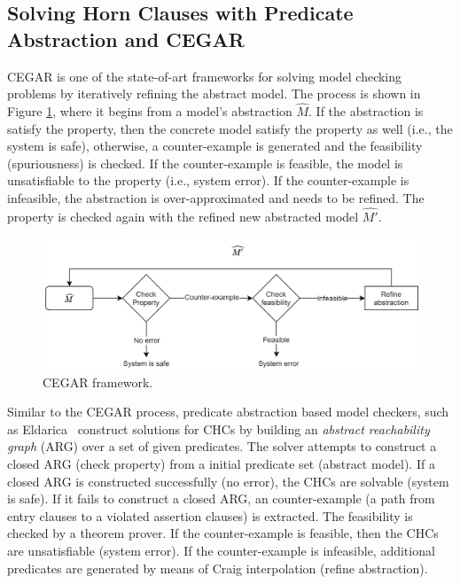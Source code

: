 \subsection{Solving Horn Clauses with Predicate Abstraction and CEGAR}

CEGAR \cite{10.1007/10722167_15} is one of the state-of-art frameworks for solving model checking problems by iteratively refining the abstract model.
%
The process is shown in Figure \ref{fig:CEGAR}, where it begins from a model's abstraction $\widehat{M}$.
%
If the abstraction is satisfy the property, then the concrete model satisfy the property as well (i.e., the system is safe), otherwise, a counter-example is generated and the feasibility (spuriousness) is checked. If the counter-example is feasible, the model is unsatisfiable to the property (i.e., system error).
%
If the counter-example is infeasible, the abstraction is over-approximated and needs to be refined.
%
The property is checked again with the refined new abstracted model $\widehat{M'}$.

\begin{figure}[t]
\centering
  \includegraphics[width=\textwidth]{figures/CEGAR}
  \caption{CEGAR framework.}\label{fig:CEGAR}
\end{figure}

Similar to the CEGAR process, predicate abstraction based model checkers, such as %
Eldarica~\cite{ruemmer2013disjunctive} construct solutions for CHCs by building an \emph{abstract reachability graph} (ARG) over a set of given predicates. 
%
The solver attempts to construct a closed ARG (check property) from a initial predicate set (abstract model).
%
If a closed ARG is constructed successfully (no error), the CHCs are solvable (system is safe).
%
If it fails to construct a closed ARG, an counter-example (a path from entry clauses to a violated assertion clauses) is extracted.
%
The feasibility is checked by a theorem prover.  If the counter-example is feasible, then the CHCs are unsatisfiable (system error).
%
If the counter-example is infeasible, additional predicates are generated by means of Craig interpolation (refine abstraction).






